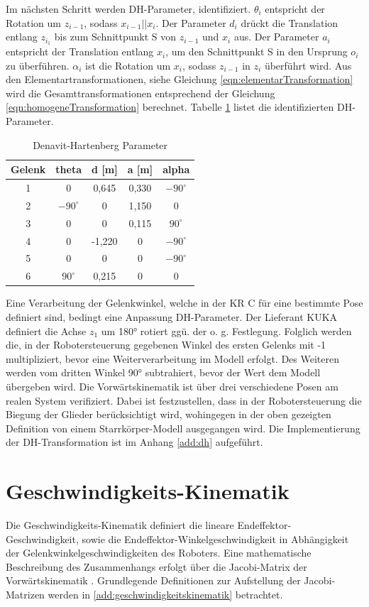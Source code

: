 %
Im nächsten Schritt werden DH-Parameter, identifiziert.  $\theta_i$ entspricht der Rotation um $z_{i-1}$, sodass $x_{i-1}||x_i$. Der Parameter $d_i$ drückt die Translation entlang $z_{i_1}$ bis zum Schnittpunkt S von $z_{i-1}$ und $x_i$ aus. Der Parameter $a_i$ entspricht der Translation entlang $x_i$, um den Schnittpunkt S in den Ursprung $o_i$ zu überführen. $\alpha_i$ ist die Rotation um $x_i$, sodass $z_{i-1}$ in $z_i$ überführt wird. Aus den Elementartransformationen, siehe Gleichung \ref{eqn:elementarTransformation} wird die Gesamttransformationen entsprechend der Gleichung \ref{eqn:homogeneTransformation} berechnet. Tabelle \ref{tab:dh} listet die identifizierten DH-Parameter. 
%
\begin{table}[tbph]
	\centering
	\caption{Denavit-Hartenberg Parameter}
	\label{tab:dh}
	\begin{tabular}{|c|c|c|c|c|}
		\hline
		Gelenk & theta & d [m] & a [m] & alpha \\
		\hline
		1& 0 & 0,645 & 0,330 & $-90^\circ$ \\
		\hline
		2& $-90^\circ$ & 0 & 1,150 & 0 \\
		\hline
		3& 0 & 0 & 0,115 & $90^\circ$ \\
		\hline
		4& 0 & -1,220 & 0 & $-90^\circ$ \\
		\hline
		5& 0 & 0 & 0 & $-90^\circ$ \\
		\hline
		6& $90^\circ$ & 0,215 & 0 & 0 \\
		\hline
	\end{tabular}
\end{table}
%
Eine Verarbeitung der Gelenkwinkel, welche in der KR C für eine bestimmte Pose definiert sind, bedingt eine Anpassung DH-Parameter. Der Lieferant KUKA definiert die Achse $z_{1}$ um 180° rotiert ggü. der o. g. Festlegung. Folglich werden die, in der Robotersteuerung gegebenen Winkel des ersten Gelenks  mit -1 multipliziert, bevor eine Weiterverarbeitung im Modell erfolgt. Des Weiteren werden vom dritten Winkel 90° subtrahiert, bevor der Wert dem Modell übergeben wird. Die Vorwärtskinematik ist über drei verschiedene Posen am realen System verifiziert. Dabei ist festzustellen, dass in der Robotersteuerung die Biegung der Glieder berücksichtigt wird, wohingegen in der oben gezeigten Definition von einem Starrkörper-Modell ausgegangen wird. 
Die Implementierung der DH-Transformation ist im Anhang \ref{add:dh}  aufgeführt. 
%
\section{Geschwindigkeits-Kinematik}
Die Geschwindigkeits-Kinematik definiert die lineare Endeffektor-Geschwindigkeit, sowie die  Endeffektor-Winkelgeschwindigkeit in Abh{\"a}ngigkeit der Gelenkwinkelgeschwindigkeiten des Roboters. Eine mathematische Beschreibung des Zusammenhangs erfolgt {\"u}ber die Jacobi-Matrix der Vorw{\"a}rtskinematik \cite[S.~101]{Spong.2020}. Grundlegende Definitionen zur Aufstellung der Jacobi-Matrizen werden in \ref{add:geschwindigkeitskinematik} betrachtet. 
